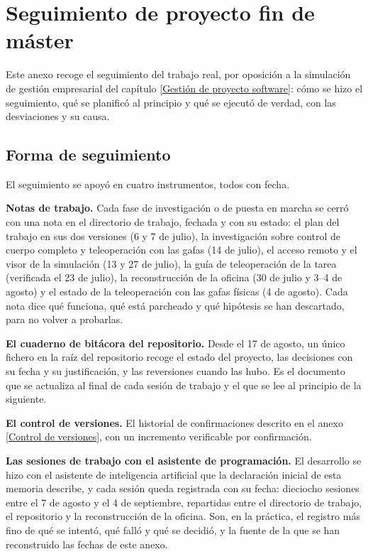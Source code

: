 \chapter{Seguimiento de proyecto fin de máster}
\label{Seguimiento de proyecto fin de máster}

Este anexo recoge el seguimiento del trabajo real, por oposición a la simulación de gestión
empresarial del capítulo \ref{Gestión de proyecto software}: cómo se hizo el seguimiento, qué se
planificó al principio y qué se ejecutó de verdad, con las desviaciones y su causa.

\section{Forma de seguimiento}

El seguimiento se apoyó en cuatro instrumentos, todos con fecha.

\textbf{Notas de trabajo.} Cada fase de investigación o de puesta en marcha se cerró con una nota
en el directorio de trabajo, fechada y con su estado: el plan del trabajo en sus dos versiones (6 y
7 de julio), la investigación sobre control de cuerpo completo y teleoperación con las gafas (14 de
julio), el acceso remoto y el visor de la simulación (13 y 27 de julio), la guía de teleoperación
de la tarea (verificada el 23 de julio), la reconstrucción de la oficina (30 de julio y 3--4 de
agosto) y el estado de la teleoperación con las gafas físicas (4 de agosto). Cada nota dice qué
funciona, qué está parcheado y qué hipótesis se han descartado, para no volver a probarlas.

\textbf{El cuaderno de bitácora del repositorio.} Desde el 17 de agosto, un único fichero en la
raíz del repositorio recoge el estado del proyecto, las decisiones con su fecha y su
justificación, y las reversiones cuando las hubo. Es el documento que se actualiza al final de
cada sesión de trabajo y el que se lee al principio de la siguiente.

\textbf{El control de versiones.} El historial de confirmaciones descrito en el anexo
\ref{Control de versiones}, con un incremento verificable por confirmación.

\textbf{Las sesiones de trabajo con el asistente de programación.} El desarrollo se hizo con el
asistente de inteligencia artificial que la declaración inicial de esta memoria describe, y cada
sesión queda registrada con su fecha: dieciocho sesiones entre el 7 de agosto y el 4 de septiembre,
repartidas entre el directorio de trabajo, el repositorio y la reconstrucción de la oficina. Son,
en la práctica, el registro más fino de qué se intentó, qué falló y qué se decidió, y la fuente de
la que se han reconstruido las fechas de este anexo.

